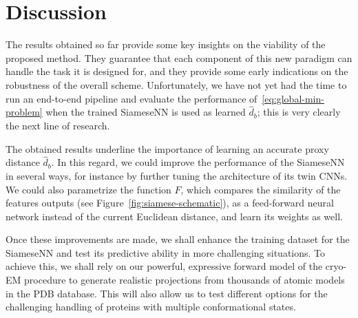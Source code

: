 \section{Discussion}
\label{sec:discussion}

The results obtained so far provide some key insights on the viability of the proposed method. They guarantee that each component of this new paradigm can handle the task it is designed for, and they provide some early indications on the robustness of the overall scheme. Unfortunately, we have not yet had the time to run an end-to-end pipeline and evaluate the performance of~\eqref{eq:global-min-problem} when the trained SiameseNN is used as learned $\widehat{d}_b$; this is very clearly the next line of research. 

The obtained results underline the importance of learning an accurate proxy distance $\widehat{d}_b$. In this regard, we could improve the performance of the SiameseNN in several ways, for instance by further tuning the architecture of its twin CNNs. We could also parametrize the function $F$, which compares the similarity of the features outputs (see Figure~\ref{fig:siamese-schematic}), as a feed-forward neural network instead of the current Euclidean distance, and learn its weights as well. 

Once these improvements are made, we shall enhance the training dataset for the SiameseNN and test its predictive ability in more challenging situations. To achieve this, we shall rely on our powerful, expressive forward model of the cryo-EM procedure to generate realistic projections from thousands of atomic models in the PDB database. This will also allow us to test different options for the challenging handling of proteins with multiple conformational states. 

